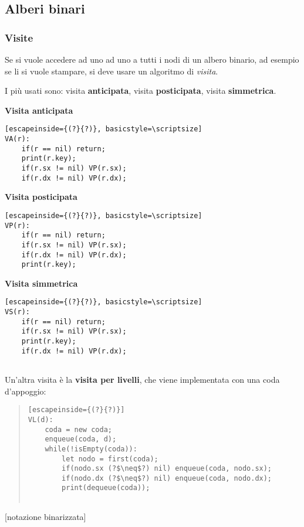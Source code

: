 \documentclass[a4paper,10pt]{article}
\theoremstyle{definition}
\begin{document}
\subsection{Alberi binari}
\subsubsection{Visite}
Se si vuole accedere ad uno ad uno a tutti i nodi di un albero binario, ad esempio se li si vuole stampare, si deve usare un algoritmo di \emph{visita}.

I più usati sono: visita \textbf{anticipata}, visita \textbf{posticipata}, visita \textbf{simmetrica}.\smallskip
\begin{center}

\begin{multicols}{3}
\textbf{Visita anticipata}
 
\begin{lstlisting}[escapeinside={(?}{?)}, basicstyle=\scriptsize]
VA(r):
    if(r == nil) return;
    print(r.key);
    if(r.sx != nil) VP(r.sx);
    if(r.dx != nil) VP(r.dx);
\end{lstlisting}


\textbf{Visita posticipata}

\begin{lstlisting}[escapeinside={(?}{?)}, basicstyle=\scriptsize]
VP(r):
    if(r == nil) return;
    if(r.sx != nil) VP(r.sx);
    if(r.dx != nil) VP(r.dx);
    print(r.key);
\end{lstlisting}

\textbf{Visita simmetrica}

\begin{lstlisting}[escapeinside={(?}{?)}, basicstyle=\scriptsize]
VS(r):
    if(r == nil) return;
    if(r.sx != nil) VP(r.sx);
    print(r.key);
    if(r.dx != nil) VP(r.dx);
   
\end{lstlisting}


\end{multicols}
\end{center}
Un'altra visita è la \textbf{visita per livelli}, che viene implementata con una coda d'appoggio:
\begin{quote}
\begin{lstlisting}[escapeinside={(?}{?)}]
VL(d):
    coda = new coda;
    enqueue(coda, d);
    while(!isEmpty(coda)):
        let nodo = first(coda);
        if(nodo.sx (?$\neq$?) nil) enqueue(coda, nodo.sx);
        if(nodo.dx (?$\neq$?) nil) enqueue(coda, nodo.dx);
        print(dequeue(coda));
   
\end{lstlisting}
\end{quote}
[notazione binarizzata]
\end{document}
